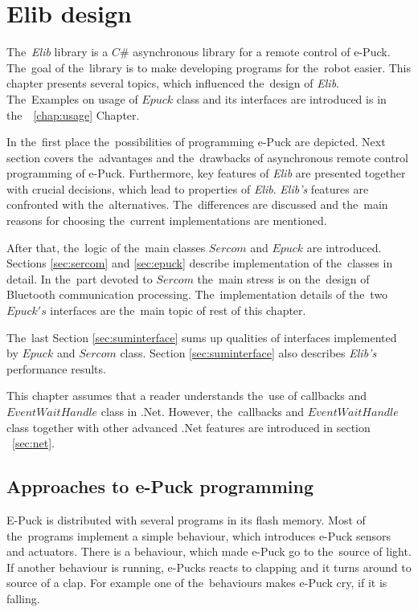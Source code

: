 \chapter{Elib design} \label{chap:elib}
  The~{\it Elib} library is a $C\#$ asynchronous library for a remote control of e-Puck. 
  The~goal of the~library is to make developing programs for the~robot easier.
  This chapter presents several topics, which influenced the~design of {\it Elib}.
  The~Examples on usage of $Epuck$ class and its interfaces are introduced is in the~~\ref{chap:usage} Chapter.

  In the~first place the~possibilities of programming e-Puck are depicted.
  Next section covers the~advantages and the~drawbacks of asynchronous remote control programming of e-Puck.
  Furthermore, key features of {\it Elib} are presented together with crucial decisions, which
  lead to properties of {\it Elib}. 
  {\it Elib's} features are confronted with the~alternatives. The~differences are discussed
  and the~main reasons for choosing the~current implementations are mentioned.

  After that, the~logic of the~main classes $Sercom$ and $Epuck$ are introduced. Sections 
  \ref{sec:sercom} and \ref{sec:epuck} describe implementation of the~classes in detail. 
  In the~part devoted to $Sercom$ the~main stress is on the~design of Bluetooth communication processing.
  The~implementation details of the~two $Epuck's$ interfaces are the~main topic of rest of this chapter. 

  The~last Section \ref{sec:suminterface} sums up qualities of interfaces 
  implemented by $Epuck$ and $Sercom$ class.
  Section \ref{sec:suminterface} also describes {\it Elib's} performance results.

  This chapter assumes that a reader understands the~use of callbacks and $EventWaitHandle$ class in .Net.
  However, the~callbacks and $EventWaitHandle$ class together with other advanced .Net features 
  are introduced in section ~\ref{sec:net}.

\section{Approaches to e-Puck programming} \label{sec:approach}
  E-Puck is distributed with several programs in its flash memory. 
  Most of the~programs implement a simple behaviour, which introduces e-Puck sensors and actuators.
  There is a behaviour, which made e-Puck go to the~source of light.
  If another behaviour is running, e-Pucks
  reacts to clapping and it turns around to source of a clap. For example one of the~behaviours makes
  e-Puck cry, if it is falling.
   
